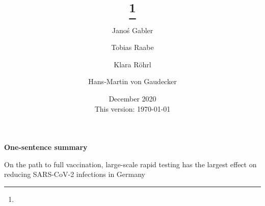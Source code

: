 

\title{\sffamily\bfseries%
	\papertitle%
	\thanks{\protect}%
}

\author[a, b]{Janoś Gabler}
\author[c]{Tobias Raabe}
\author[a]{Klara Röhrl}
\author[b,d]{Hans-Martin von Gaudecker}


\date{%
	\vfill%
	December 2020 \\
	This version: \today%
}

\maketitle

\vfill

\textbf{One-sentence summary}

On the path to full vaccination, large-scale rapid testing has the largest effect on reducing SARS-CoV-2 infections in Germany

\begin{abstract}%
	\!
\end{abstract}

\vfill

\clearpage
